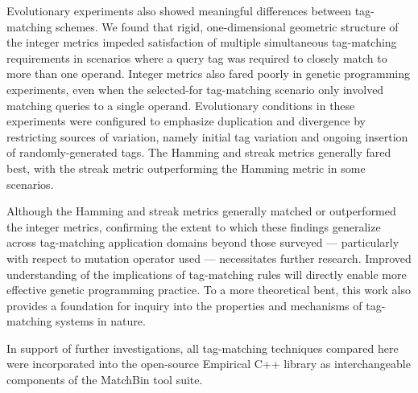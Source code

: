 Evolutionary experiments also showed meaningful differences between tag-matching schemes.
We found that rigid, one-dimensional geometric structure of the integer metrics impeded satisfaction of multiple simultaneous tag-matching requirements in scenarios where a query tag was required to closely match to more than one operand.
Integer metrics also fared poorly in genetic programming experiments, even when the selected-for tag-matching scenario only involved matching queries to a single operand.
Evolutionary conditions in these experiments were configured to emphasize duplication and divergence by restricting sources of variation, namely initial tag variation and ongoing insertion of randomly-generated tags.
The Hamming and streak metrics generally fared best, with the streak metric outperforming the Hamming metric in some scenarios.

Although the Hamming and streak metrics generally matched or outperformed the integer metrics, confirming the extent to which these findings generalize across tag-matching application domains beyond those surveyed --- particularly with respect to mutation operator used --- necessitates further research.
Improved understanding of the implications of tag-matching rules will directly enable more effective genetic programming practice.
To a more theoretical bent, this work also provides a foundation for inquiry into the properties and mechanisms of tag-matching systems in nature.

In support of further investigations, all tag-matching techniques compared here were incorporated into the open-source Empirical C++ library \citep{charles_ofria_2019_2575607} as interchangeable components of the MatchBin tool suite.







